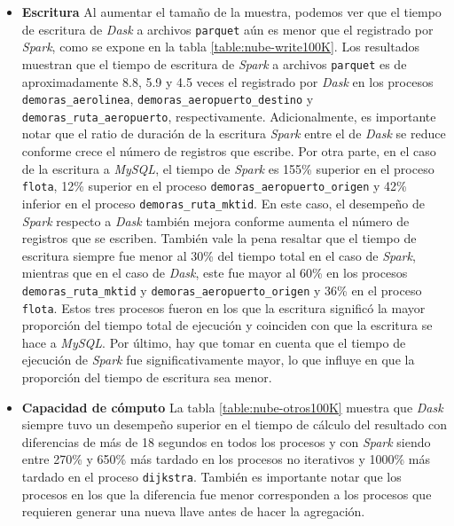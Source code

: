 \begin{itemize}
	\item \textbf{Escritura} Al aumentar el tamaño de la muestra, podemos ver que el tiempo de escritura de \textit{Dask} a archivos \texttt{parquet} aún es menor que el registrado por \textit{Spark}, como se expone en la tabla \ref{table:nube-write100K}. Los resultados muestran que el tiempo de escritura de \textit{Spark} a archivos \texttt{parquet} es de aproximadamente 8.8, 5.9 y 4.5 veces el registrado por \textit{Dask} en los procesos \texttt{demoras\_aerolinea}, \texttt{demoras\_aeropuerto\_destino} y \texttt{demoras\_ruta\_aeropuerto}, respectivamente. Adicionalmente, es importante notar que el ratio de duración de la escritura \textit{Spark} entre el de \textit{Dask} se reduce conforme crece el número de registros que escribe. Por otra parte, en el caso de la escritura a \textit{MySQL}, el tiempo de \textit{Spark} es 155\% superior en el proceso \texttt{flota}, 12\% superior en el proceso \texttt{demoras\_aeropuerto\_origen} y 42\% inferior en el proceso \texttt{demoras\_ruta\_mktid}. En este caso, el desempeño de \textit{Spark} respecto a \textit{Dask} también mejora conforme aumenta el número de registros que se escriben. También vale la pena resaltar que el tiempo de escritura siempre fue menor al 30\% del tiempo total en el caso de \textit{Spark}, mientras que en el caso de \textit{Dask}, este fue mayor al 60\% en los procesos \texttt{demoras\_ruta\_mktid} y \texttt{demoras\_aeropuerto\_origen} y 36\% en el proceso \texttt{flota}. Estos tres procesos fueron en los que la escritura significó la mayor proporción del tiempo total de ejecución y coinciden con que la escritura se hace a \textit{MySQL}. Por último, hay que tomar en cuenta que el tiempo de ejecución de \textit{Spark} fue significativamente mayor, lo que influye en que la proporción del tiempo de escritura sea menor.
	
	\item \textbf{Capacidad de cómputo} La tabla \ref{table:nube-otros100K} muestra que \textit{Dask} siempre tuvo un desempeño superior en el tiempo de cálculo del resultado con diferencias de más de 18 segundos en todos los procesos y con \textit{Spark} siendo entre 270\% y 650\% más tardado en los procesos no iterativos y 1000\% más tardado en el proceso \texttt{dijkstra}. También es importante notar que los procesos en los que la diferencia fue menor corresponden a los procesos que requieren generar una nueva llave antes de hacer la agregación.
	

\end{itemize}
